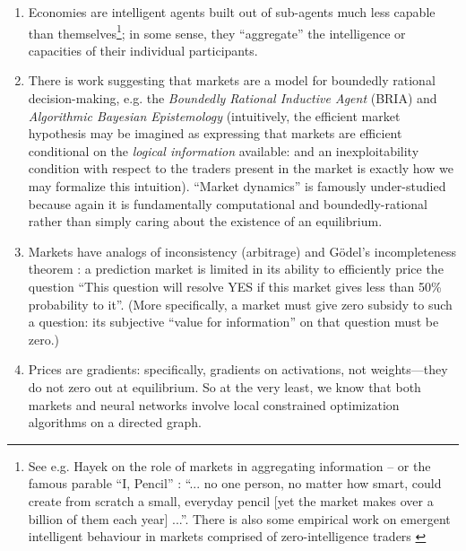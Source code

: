 \begin{enumerate}
  \item Economies are intelligent agents built out of sub-agents much less capable than
  themselves\footnote{See e.g. Hayek on the role of markets in aggregating information \citep{hayekEconomicsKnowledge1937} -- or the famous parable ``I, Pencil'' \citep{leonardereadPencilMyFamily1958}: ``... no one person, no matter how smart, could create from scratch a small, everyday pencil [yet the market makes over a billion of them each year] ...''. There is also some empirical work on emergent intelligent behaviour in markets comprised of zero-intelligence traders \citep{godeAllocativeEfficiencyMarkets1993, schwartzHowMuchIrrationality2008, jamalSimpleAgentsIntelligent2015}}; in some sense, they ``aggregate'' the intelligence or capacities of their individual participants.
  \item There is work suggesting that markets are a model for boundedly rational decision-making, e.g. the \emph{Boundedly Rational Inductive Agent} (BRIA) \citep{oesterheldTheoryBoundedInductive2023} and \emph{Algorithmic Bayesian Epistemology} \citep{neymanAlgorithmicBayesianEpistemology2024} (intuitively, the efficient market hypothesis may be imagined as expressing that markets are efficient conditional on the \emph{logical information} available: and an inexploitability condition with respect to the traders present in the market is exactly how we may formalize this intuition). ``Market dynamics'' is famously under-studied because again it is
  fundamentally computational and boundedly-rational rather than simply caring about the existence of an equilibrium. 
  \item Markets have analogs of inconsistency (arbitrage) and G\"odel's incompleteness theorem \citep{pallavisudhirMeaningfulThings2022}: a prediction market is limited in its ability to efficiently
  price the question ``This question will resolve YES if this market gives less than 50\%
  probability to it''. (More specifically, a market must give zero subsidy to such a
  question: its subjective ``value for information'' on that question must be zero.)
  \item Prices are gradients: specifically, gradients on activations, not
  weights---they do not zero out at equilibrium. So at the very least, we know that both markets and neural networks involve local constrained optimization algorithms on a directed graph.
\end{enumerate}

